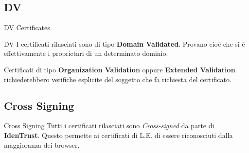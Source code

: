 \documentclass[xcolor=svgnames,11pt]{beamer}
\begin{document}
\subsection{DV}
\begin{frame}{DV Certificates}
\begin{block}{DV}
I certificati rilasciati sono di tipo \textbf{Domain Validated}. Provano cioè
che si è effettivamente i proprietari di un determinato dominio.
\end{block}
\medskip\pause

Certificati di tipo \textbf{Organization Validation} oppure \textbf{Extended Validation}
richiederebbero verifiche esplicite del soggetto che fa richiesta del certificato.

\end{frame}

\subsection{Cross Signing}
\begin{frame}{Cross Signing}
Tutti i certificati rilasciati sono \emph{Cross-signed} da parte di \textbf{IdenTrust}.
Questo permette ai certificati di L.E. di essere riconosciuti dalla maggioranza dei browser.

\medskip

\end{frame}
\end{document}
